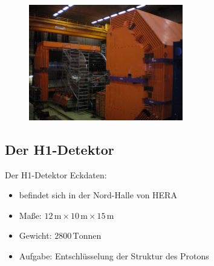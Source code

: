 \documentclass[aspectratio=1610, 9pt]{beamer}
\begin{document}
\begin{frame}
  \begin{figure}
    \centering
    \includegraphics[width=0.6\textwidth]{images/Zeus-Real.jpeg}
  \end{figure}
\end{frame}

\subsection{Der H1-Detektor}

\begin{frame}{Der H1-Detektor}
  Eckdaten:
  \begin{itemize}
    \item{befindet sich in der Nord-Halle von HERA}
    \item{Maße: $12 \,\mathrm{m} \times 10 \,\mathrm{m} \times 15 \,\mathrm{m}  $  } 
    \item{Gewicht: $2800 \,\mathrm{Tonnen}$ } 
    \item{Aufgabe: Entschlüsselung der Struktur des Protons}
  \end{itemize}
\end{frame}
\end{document}
